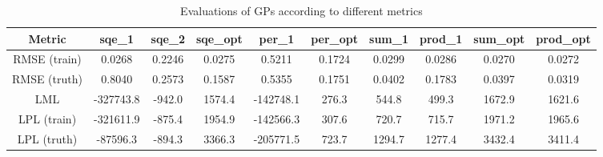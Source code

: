 \begin{table}
    \centering
    \begin{tabular}{|c|c|c|c|c|c|c|c|c|c|}
        \hline
        Metric & sqe\_1 & sqe\_2 & sqe\_opt & per\_1 & per\_opt & sum\_1 & prod\_1 & sum\_opt & prod\_opt \\
        \hline
        RMSE (train) & 0.0268 & 0.2246 & 0.0275 & 0.5211 & 0.1724 & 0.0299 & 0.0286 & 0.0270 & 0.0272 \\
        RMSE (truth) & 0.8040 & 0.2573 & 0.1587 & 0.5355 & 0.1751 & 0.0402 & 0.1783 & 0.0397 & 0.0319 \\
        LML & -327743.8 & -942.0 & 1574.4 & -142748.1 & 276.3 & 544.8 & 499.3 & 1672.9 & 1621.6 \\
        LPL (train) & -321611.9 & -875.4 & 1954.9 & -142566.3 & 307.6 & 720.7 & 715.7 & 1971.2 & 1965.6 \\
        LPL (truth) & -87596.3 & -894.3 & 3366.3 & -205771.5 & 723.7 & 1294.7 & 1277.4 & 3432.4 & 3411.4 \\
        \hline
    \end{tabular}
    \caption{Evaluations of GPs according to different metrics}
    \label{table:metrics}
\end{table}
